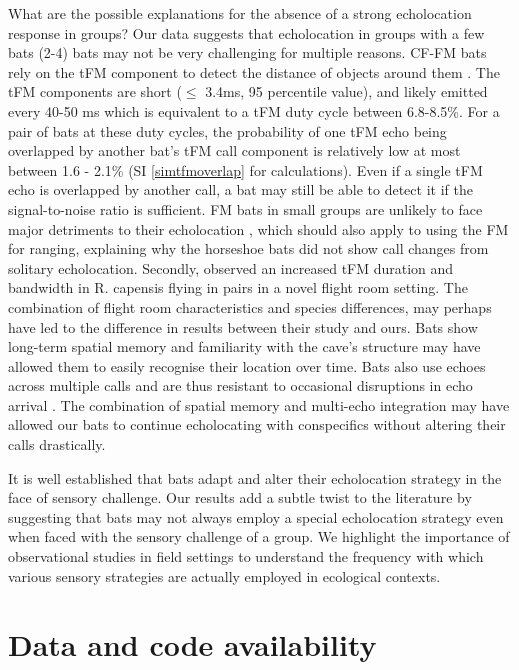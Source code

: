 \documentclass[
]{book}
\begin{document}
What are the possible explanations for the absence of a strong echolocation response in groups? Our data suggests that echolocation in groups with a few bats (2-4) bats may not be very challenging for multiple reasons. CF-FM bats rely on the tFM component to detect the distance of objects around them \citep{tian1997echolocation}. The tFM components are short (\(\leq\) 3.4ms, 95 percentile value), and likely emitted every 40-50 ms which is equivalent to a tFM duty cycle between 6.8-8.5\%. For a pair of bats at these duty cycles, the probability of one tFM echo being overlapped by another bat's tFM call component is relatively low at most between 1.6 - 2.1\% (SI \ref{simtfmoverlap} for calculations). Even if a single tFM echo is overlapped by another call, a bat may still be able to detect it if the signal-to-noise ratio is sufficient. FM bats in small groups are unlikely to face major detriments to their echolocation \citep{beleyur2019modeling}, which should also apply to using the FM for ranging, explaining why the horseshoe bats did not show call changes from solitary echolocation. Secondly, \citet{fawcett2015echolocation} observed an increased tFM duration and bandwidth in R. capensis flying in pairs in a novel flight room setting. The combination of flight room characteristics \citep{surlykke2009echolocating} and species differences, may perhaps have led to the difference in results between their study and ours. Bats show long-term spatial memory \citep{barchi2013spatial, mohres1949versuche} and familiarity with the cave's structure may have allowed them to easily recognise their location over time. Bats also use echoes across multiple calls and are thus resistant to occasional disruptions in echo arrival \citep{Salles202011719}. The combination of spatial memory and multi-echo integration may have allowed our bats to continue echolocating with conspecifics without altering their calls drastically.

It is well established that bats adapt and alter their echolocation strategy in the face of sensory challenge. Our results add a subtle twist to the literature by suggesting that bats may not always employ a special echolocation strategy even when faced with the sensory challenge of a group. We highlight the importance of observational studies in field settings to understand the frequency with which various sensory strategies are actually employed in ecological contexts.

\hypertarget{data-and-code-availability}{%
\section{Data and code availability}\label{data-and-code-availability}}
\end{document}
